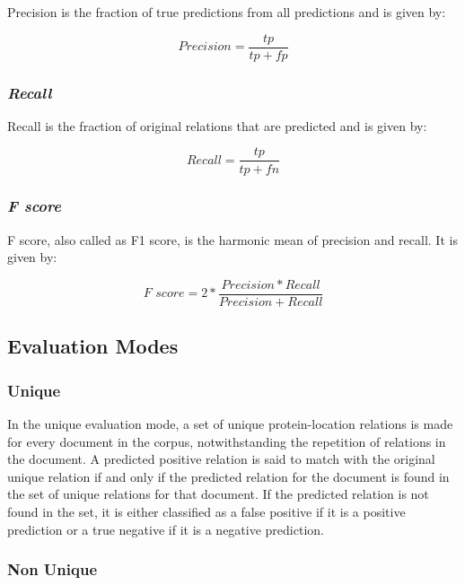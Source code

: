 Precision is the fraction of true predictions from all predictions and is given by:

$$
\textit{Precision} = \frac{tp}{tp+fp}
$$


\subsubsection*{\textit{Recall}}\label{subsubsec:Recal}

Recall is the fraction of original relations that are predicted and is given by:

$$
\textit{Recall} = \frac{tp}{tp+fn}
$$

\subsubsection*{\textit{F score}}\label{subsubsec:Fscore}

F score, also called as F1 score, is the harmonic mean of precision and recall. It is given by:

$$
\textit{F score} = 2 * \frac{Precision * Recall}{Precision + Recall}
$$



\subsection{Evaluation Modes} \label{subsec:Eval}

\subsubsection{Unique}\label{subsubsec:UniqEval}

In the unique evaluation mode, a set of unique protein-location relations is made for every document in the corpus, notwithstanding the repetition of relations in the document. A predicted positive relation is said to match with the original unique relation if and only if the predicted relation for the document is found in the set of unique relations for that document. If the predicted relation is not found in the set, it is either classified as a false positive if it is a positive prediction or a true negative if it is a negative prediction.


\subsubsection{Non Unique}\label{subsubsec:NonUniqEval}

